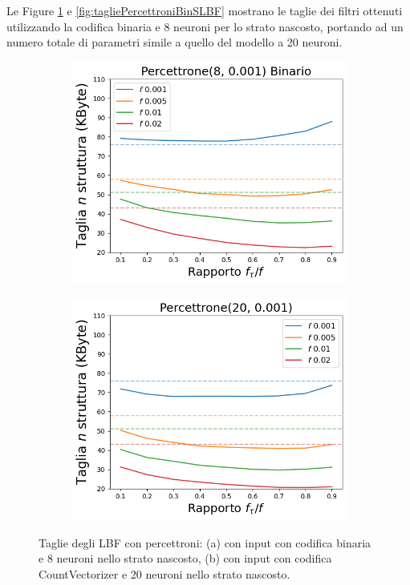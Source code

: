 \documentclass[../../main.tex]{subfiles}
\begin{document}
    Le Figure \ref{fig:tagliePercettroniBinLBF} e \ref{fig:tagliePercettroniBinSLBF} mostrano le taglie dei filtri ottenuti utilizzando la codifica binaria e 8 neuroni per lo strato nascosto, portando ad un numero totale di parametri simile a quello del modello a 20 neuroni.

    \begin{figure}[H]
        \centering
        \begin{subfigure}[b]{0.48\textwidth}
            \centering
            \includegraphics[width=\textwidth]{immagini/7/LBF/Percettrone(8, 0.001) Binario_Taglia.png}
            \caption{}
        \end{subfigure}
        \begin{subfigure}[b]{0.48\textwidth}
            \centering
            \includegraphics[width=\textwidth]{immagini/7/LBF/Percettrone(20, 0.001)_Taglia.png}
            \caption{}
        \end{subfigure}
        \caption{Taglie degli LBF con percettroni: (a) con input con codifica binaria e 8 neuroni nello strato nascosto, (b) con input con codifica CountVectorizer e 20 neuroni nello strato nascosto.}
        \label{fig:tagliePercettroniBinLBF}
    \end{figure}
\end{document}
